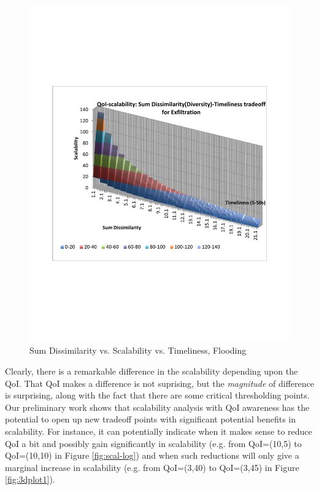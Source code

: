 \begin{figure}
    \includegraphics[scale=0.35]{figures/span_fld.pdf}
    \caption{Sum Dissimilarity vs. Scalability vs. Timeliness, Flooding}
    \label{fig:3dplot4}
\end{figure}

Clearly, there is a remarkable difference in the scalability depending upon
the QoI.%
 That QoI makes a difference is not suprising, but the {\em magnitude} of
difference is surprising, along with the fact that there are some critical
thresholding points. Our preliminary work shows that
scalability analysis with QoI awareness has the potential to
open up new tradeoff points with
significant potential benefits in scalability. For instance, it can
potentially indicate when it makes sense to reduce QoI a bit and possibly
gain significantly in scalability (e.g. from QoI=(10,5) to QoI=(10,10) in Figure
\ref{fig:scal-log}) and when such reductions will only give a marginal
increase in scalability
(e.g. from QoI=(3,40) to QoI=(3,45) in Figure \ref{fig:3dplot1}).



